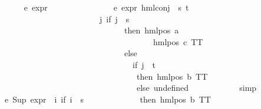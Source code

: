 \begin{isabellebody}
\isanewline
\ \ \ \ \isamarkupfalse%
\ e{}{\isacharcolon}{\kern0pt}\ {\isachardoublequoteopen}expr{\isacharunderscore}{\kern0pt}{}\ {\isasymphi}\ {\isacharequal}{\kern0pt}\ {}{\isachardoublequoteclose}\isanewline
\ \ \ \ \isamarkupfalse%
{\isacharminus}{\kern0pt}\isanewline
\ \ \ \ \ \ \isamarkupfalse%
\ e{}{\isacharunderscore}{\kern0pt}{}{\isacharcolon}{\kern0pt}\ {\isachardoublequoteopen}expr{\isacharunderscore}{\kern0pt}{}\ {\isacharparenleft}{\kern0pt}hml{\isacharunderscore}{\kern0pt}conj\ {\isacharbraceleft}{\kern0pt}{\isacharbraceright}{\kern0pt}\ {\isacharbraceleft}{\kern0pt}s{\isacharcomma}{\kern0pt}\ t{\isacharbraceright}{\kern0pt}\ \isanewline
\ \ \ \ \ \ \ \ \ \ \ \ \ \ \ \ \ \ \ \ \ \ \ \ {\isacharparenleft}{\kern0pt}{\isasymlambda}j{\isachardot}{\kern0pt}\ {\isacharparenleft}{\kern0pt}if\ j\ {\isacharequal}{\kern0pt}\ s\ \isanewline
\ \ \ \ \ \ \ \ \ \ \ \ \ \ \ \ \ \ \ \ \ \ \ \ \ \ \ \ \ \ then\ {\isacharparenleft}{\kern0pt}hml{\isacharunderscore}{\kern0pt}pos\ a\ \isanewline
\ \ \ \ \ \ \ \ \ \ \ \ \ \ \ \ \ \ \ \ \ \ \ \ \ \ \ \ \ \ \ \ \ \ \ \ \ {\isacharparenleft}{\kern0pt}hml{\isacharunderscore}{\kern0pt}pos\ c\ TT{\isacharparenright}{\kern0pt}{\isacharparenright}{\kern0pt}\ \isanewline
\ \ \ \ \ \ \ \ \ \ \ \ \ \ \ \ \ \ \ \ \ \ \ \ \ \ \ \ \ \ else\ \isanewline
\ \ \ \ \ \ \ \ \ \ \ \ \ \ \ \ \ \ \ \ \ \ \ \ \ \ \ \ \ \ \ \ {\isacharparenleft}{\kern0pt}if\ j\ {\isacharequal}{\kern0pt}\ t\ \isanewline
\ \ \ \ \ \ \ \ \ \ \ \ \ \ \ \ \ \ \ \ \ \ \ \ \ \ \ \ \ \ \ \ \ then\ {\isacharparenleft}{\kern0pt}hml{\isacharunderscore}{\kern0pt}pos\ b\ TT{\isacharparenright}{\kern0pt}\ \isanewline
\ \ \ \ \ \ \ \ \ \ \ \ \ \ \ \ \ \ \ \ \ \ \ \ \ \ \ \ \ \ \ \ \ else\ undefined{\isacharparenright}{\kern0pt}{\isacharparenright}{\kern0pt}{\isacharparenright}{\kern0pt}{\isacharparenright}{\kern0pt}\ {\isacharequal}{\kern0pt}\ {}{\isachardoublequoteclose}\isanewline
\ \ \ \ \ \ \ \ \isamarkupfalse%
\ simp\isanewline
\ \ \ \ \ \ \isamarkupfalse%
\ e{}{\isacharunderscore}{\kern0pt}{}{\isacharcolon}{\kern0pt}\ {\isachardoublequoteopen}{\isacharparenleft}{\kern0pt}Sup\ {\isacharparenleft}{\kern0pt}{\isacharparenleft}{\kern0pt}expr{\isacharunderscore}{\kern0pt}{}\ {\isasymcirc}\ {\isacharparenleft}{\kern0pt}{\isasymlambda}i{\isachardot}{\kern0pt}\ {\isacharparenleft}{\kern0pt}if\ i\ {\isacharequal}{\kern0pt}\ s\ \isanewline
\ \ \ \ \ \ \ \ \ \ \ \ then\ {\isacharparenleft}{\kern0pt}hml{\isacharunderscore}{\kern0pt}pos\ b\ TT{\isacharparenright}{\kern0pt}\ \isanewline

\end{isabellebody}
